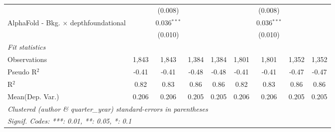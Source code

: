 \begin{tabular}{lcccccccc}
                                                  &         & (0.008)       &       &       &         & (0.008)       &       &   \\   
   AlphaFold - Bkg. $\times$ depthfoundational    &         & 0.036$^{***}$ &       &       &         & 0.036$^{***}$ &       &   \\   
                                                  &         & (0.010)       &       &       &         & (0.010)       &       &   \\   
   \midrule
   \emph{Fit statistics}\\
   Observations                                   & 1,843   & 1,843         & 1,384 & 1,384 & 1,801   & 1,801         & 1,352 & 1,352\\  
   Pseudo R$^2$                                   & -0.41   & -0.41         & -0.48 & -0.48 & -0.41   & -0.41         & -0.47 & -0.47\\  
   R$^2$                                          & 0.82    & 0.83          & 0.86  & 0.86  & 0.82    & 0.83          & 0.86  & 0.86\\  
Mean(Dep. Var.) & 0.206 & 0.206 & 0.205 & 0.205 & 0.206 & 0.206 & 0.205 & 0.205 \\
   \midrule \midrule
   \multicolumn{9}{l}{\emph{Clustered (author \& quarter\_year) standard-errors in parentheses}}\\
   \multicolumn{9}{l}{\emph{Signif. Codes: ***: 0.01, **: 0.05, *: 0.1}}\\
\end{tabular}
\par\endgroup
